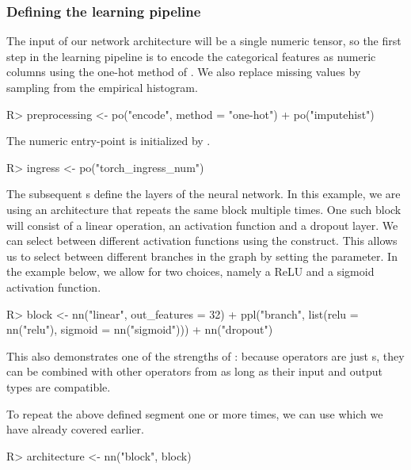\documentclass[article]{jss}
\theoremstyle{definition}
\begin{document}
\subsubsection{Defining the learning pipeline}
The input of our network architecture will be a single numeric tensor, so the first step in the learning pipeline is to encode the categorical features as numeric columns using the one-hot method of .
We also replace missing values by sampling from the empirical histogram.

\begin{CodeInput}
R> preprocessing <- po("encode", method = "one-hot") %
+    po("imputehist")
\end{CodeInput}

The numeric entry-point is initialized by .

\begin{CodeInput}
R> ingress <- po("torch_ingress_num")
\end{CodeInput}

The subsequent s define the layers of the neural network.
In this example, we are using an architecture that repeats the same block multiple times.
One such block will consist of a linear operation, an activation function and a dropout layer.
We can select between different activation functions using the  construct.
This allows us to select between different branches in the graph by setting the  parameter.
In the example below, we allow for two choices, namely a ReLU and a sigmoid activation function.

\begin{CodeInput}
R> block <- nn("linear", out_features = 32) %
+    ppl("branch", list(relu = nn("relu"), sigmoid = nn("sigmoid"))) %
+    nn("dropout")
\end{CodeInput}

This also demonstrates one of the strengths of : because  operators are just s, they can be combined with other operators from  as long as their input and output types are compatible.

To repeat the above defined segment one or more times, we can use  which we have already covered earlier.

\begin{CodeInput}
R> architecture <- nn("block", block) %
\end{CodeInput}
\end{document}
